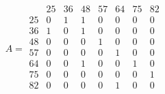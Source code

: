 \documentclass{article}
\begin{document}
\begin{equation*}
A = \begin{array}{c|ccccccc}
   & 25 & 36 & 48 & 57 & 64 & 75 & 82 \\
\hline
25 & 0 & 1 & 1 & 0 & 0 & 0 & 0 \\
36 & 1 & 0 & 1 & 0 & 0 & 0 & 0 \\
48 & 0 & 0 & 0 & 1 & 0 & 0 & 0 \\
57 & 0 & 0 & 0 & 0 & 1 & 0 & 0 \\
64 & 0 & 0 & 1 & 0 & 0 & 1 & 0 \\
75 & 0 & 0 & 0 & 0 & 0 & 0 & 1 \\
82 & 0 & 0 & 0 & 0 & 1 & 0 & 0 \\
\end{array}
\end{equation*}
\end{document}
